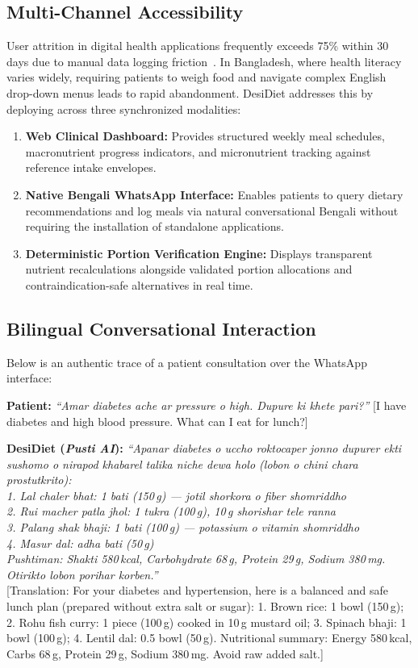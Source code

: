 \documentclass[5p,times,twocolumn]{elsarticle}
\makeatletter
\def\systemname{DesiDiet}%
\def\my@bx{bx}
\def\my@b{b}
\DeclareRobustCommand{\systemname}{%
  \texorpdfstring{%
    \ifx\f@series\my@bx
      DesiDiet%
    \else\ifx\f@series\my@b
      DesiDiet%
    \else
      \textsc{DesiDiet}%
    \fi\fi
  }{DesiDiet}%
}
\newcommand{\agentA}{\textit{Pusti AI}}
\makeatother
\begin{document}
\subsection{Multi-Channel Accessibility}
User attrition in digital health applications frequently exceeds 75\% within 30 days due to manual data logging friction~\cite{villinger2019health}. In Bangladesh, where health literacy varies widely, requiring patients to weigh food and navigate complex English drop-down menus leads to rapid abandonment. \systemname{} addresses this by deploying across three synchronized modalities:
\begin{enumerate}[leftmargin=*,itemsep=1.5pt]
  \item \textbf{Web Clinical Dashboard:} Provides structured weekly meal schedules, macronutrient progress indicators, and micronutrient tracking against reference intake envelopes.
  \item \textbf{Native Bengali WhatsApp Interface:} Enables patients to query dietary recommendations and log meals via natural conversational Bengali without requiring the installation of standalone applications.
  \item \textbf{Deterministic Portion Verification Engine:} Displays transparent nutrient recalculations alongside validated portion allocations and contraindication-safe alternatives in real time.
\end{enumerate}

\subsection{Bilingual Conversational Interaction}
Below is an authentic trace of a patient consultation over the WhatsApp interface:

\medskip
\noindent\textbf{Patient:} \textit{``Amar diabetes ache ar pressure o high. Dupure ki khete pari?''} [I have diabetes and high blood pressure. What can I eat for lunch?]

\smallskip
\noindent\textbf{\systemname{} (\agentA{}):} \textit{``Apanar diabetes o uccho roktocaper jonno dupurer ekti sushomo o nirapod khabarel talika niche dewa holo (lobon o chini chara prostutkrito):}\\
\textit{1. Lal chaler bhat: 1 bati (150\,g) --- jotil shorkora o fiber shomriddho}\\
\textit{2. Rui macher patla jhol: 1 tukra (100\,g), 10\,g shorishar tele ranna}\\
\textit{3. Palang shak bhaji: 1 bati (100\,g) --- potassium o vitamin shomriddho}\\
\textit{4. Masur dal: adha bati (50\,g)}\\
\textit{Pushtiman: Shakti 580\,kcal, Carbohydrate 68\,g, Protein 29\,g, Sodium 380\,mg. Otirikto lobon porihar korben.''}\\
{[Translation: For your diabetes and hypertension, here is a balanced and safe lunch plan (prepared without extra salt or sugar): 1. Brown rice: 1 bowl (150\,g); 2. Rohu fish curry: 1 piece (100\,g) cooked in 10\,g mustard oil; 3. Spinach bhaji: 1 bowl (100\,g); 4. Lentil dal: 0.5 bowl (50\,g). Nutritional summary: Energy 580\,kcal, Carbs 68\,g, Protein 29\,g, Sodium 380\,mg. Avoid raw added salt.]}
\end{document}
